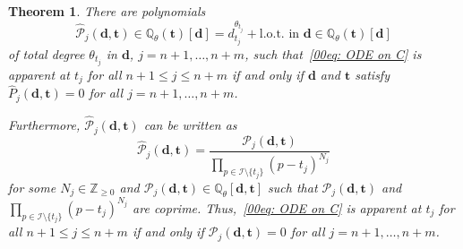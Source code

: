 \documentclass[11pt]{article}
\numberwithin{equation}{section}
\numberwithin{equation}{section}
\newtheorem{Theorem}{Theorem}[section]
\def\Q{\mathbb Q}
\def\bt{\boldsymbol t}
\begin{document}
\begin{Theorem} \label{prop: apparent}
 There are polynomials
 \[
 \hat{\mathcal{P}}_j(\boldsymbol d,\boldsymbol t)\in\Q_\theta(\bt)[\boldsymbol d]=d_{t_{j}}^{\theta_{t_j}}+ \text{l.o.t.\ in $\boldsymbol d$} \in \Q_\theta(\boldsymbol t)[\boldsymbol d]
 \]
 of total degree $\theta_{t_j}$ in $\boldsymbol d$, $j=n+1,\dots,n+m$,
 such that~\eqref{00eq: ODE on C}
 is apparent at $t_j$ for all $n+1\leq j\leq n+m$ if
 and only if $\boldsymbol{d}$ and $\bt$ satisfy $\hat{P}_j(\boldsymbol{d},\bt)=0$ for all
 $j=n+1,\dots,n+m$.

 Furthermore,
 $\hat{\mathcal{P}}_j(\boldsymbol{d},\bt)$ can be written as
 \begin{equation}\label{e22q:PP}\hat{\mathcal{P}}_j(\boldsymbol{d},\bt)=\frac{\mathcal{P}_j(\boldsymbol{d},\bt)}
 {\prod_{p\in\mathcal{I}\setminus\{t_j\}}(p-t_j)^{N_j}}\end{equation}
 for some $N_j\in\mathbb{Z}_{\geq 0}$ and $\mathcal{P}_j(\boldsymbol{d},\bt)\in \Q_{\theta}[\boldsymbol{d},\bt]$ such that $\mathcal{P}_j(\boldsymbol{d},\bt)$ and $\prod_{p\in\mathcal{I}\setminus\{t_j\}}(p-t_j)^{N_j}$ are coprime. Thus,~\eqref{00eq: ODE on C}
 is apparent at $t_j$ for all $n+1\leq j\leq n+m$ if
 and only if $\mathcal{P}_j(\boldsymbol{d},\bt)=0$ for all
 $j=n+1,\dots,n+m$.
\end{Theorem}
\end{document}
